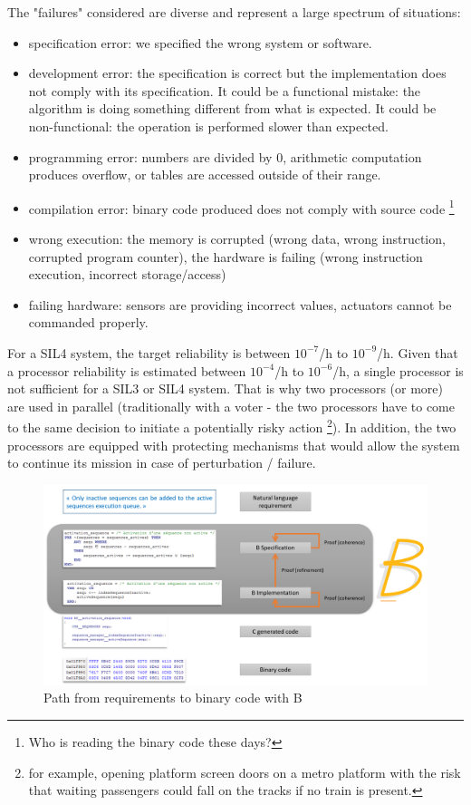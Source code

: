\noindent The "failures" considered are diverse and represent a large spectrum of situations: 
\begin{itemize}
    \item specification error: we specified the wrong system or software.
    \item development error: the specification is correct but the implementation does not comply with its specification. It could be a functional mistake: the algorithm is doing something different from what is expected. It could be non-functional: the operation is performed slower than expected.
    \item programming error: numbers are divided by 0, arithmetic computation produces overflow, or tables are accessed outside of their range.
    \item compilation error: binary code produced does not comply with source code \footnote{Who is reading the binary code these days?}
    \item wrong execution: the memory is corrupted (wrong data, wrong instruction, corrupted program counter), the hardware is failing (wrong instruction execution, incorrect storage/access)
    \item failing hardware: sensors are providing incorrect values, actuators cannot be commanded properly.
\end{itemize}

For a SIL4 system, the target reliability is between $10^{-7}$/h to $10^{-9}$/h. Given that a processor reliability is estimated between $10^{-4}$/h to $10^{-6}$/h, a single processor is not sufficient for a SIL3 or SIL4 system. That is why two processors (or more) are used in parallel (traditionally with a voter - the two processors have to come to the same decision to initiate a potentially risky action \footnote{for example, opening platform screen doors on a metro platform with the risk that waiting passengers could fall on the tracks if no train is present.}). In addition, the two processors are equipped with protecting mechanisms that would allow the system to continue its mission in case of perturbation / failure.  



\begin{figure}[h]
\centering\includegraphics[scale=0.3]{Pictures/chapterSafetyPrinciples/SAFETY-Bcycle.png}
\caption{Path from requirements to binary code with B}
\label{safety:B}
\end{figure}

